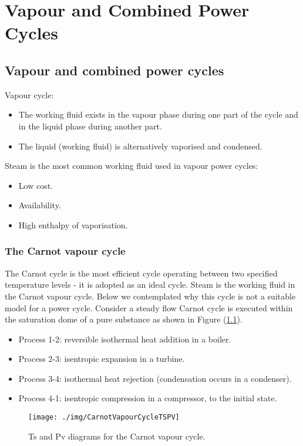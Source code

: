 \chapter{Vapour and Combined Power Cycles}
\section{Vapour and combined power cycles}
Vapour cycle:
\begin{itemize}[noitemsep]
  \item The working fluid exists in the vapour phase during one part of the cycle and in the liquid phase during another part.
  \item The liquid (working fluid) is alternatively vaporised and condensed.
\end{itemize}
Steam is the most common working fluid used in vapour power cycles:
\begin{itemize}[noitemsep]
  \item Low cost.
  \item Availability.
  \item High enthalpy of vaporisation.
\end{itemize}
\subsection{The Carnot vapour cycle}
The Carnot cycle is the most efficient cycle operating between two specified temperature levels - it is adopted as an ideal cycle. Steam is the working fluid in the Carnot vapour cycle. Below we contemplated why this cycle is not a suitable model for a power cycle. Consider a steady flow Carnot cycle is executed within the saturation dome of a pure substance as shown in Figure (\ref{CarnotVapourCycle}).
\begin{itemize}[noitemsep]
  \item Process 1-2: reversible isothermal heat addition in a boiler.
  \item Process 2-3: isentropic expansion in a turbine.
  \item Process 3-4: isothermal heat rejection (condensation occurs in a condenser).
  \item Process 4-1: isentropic compression in a compressor, to the initial state.
\end{itemize}
\begin{figure}
  \centering
  \texttt{[image: ./img/CarnotVapourCycleTSPV]}
  \caption{Ts and Pv diagrams for the Carnot vapour cycle.}
  \label{CarnotVapourCycle}
\end{figure}
